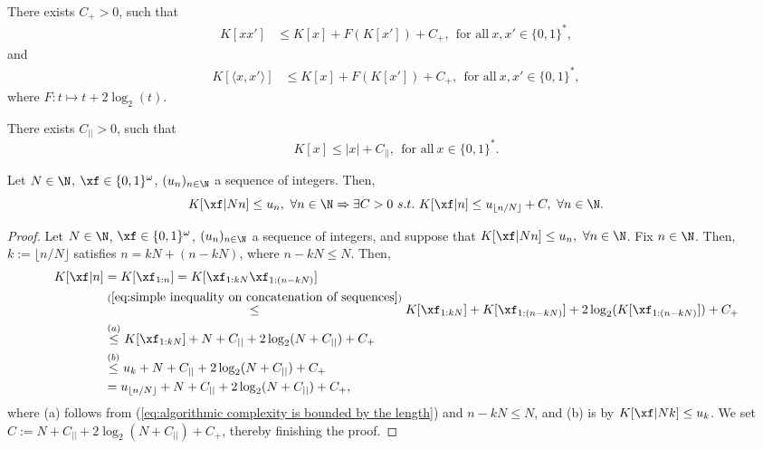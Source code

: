\begin{lemma}
	\cite[Example 2.1.5]{li2008introduction} There exists $C_+>0$, such that
	\begin{align}\label{eq:simple inequality on concatenation of sequences}
		K[ x x'] &\leq K[x] + F(K[x']) + C_+, \ \ \text{for all} \ x,x' \in \{0,1\}^\ast,
	\end{align}
	and
	\begin{align}\label{eq:simple inequality on pairing of sequences}
		K[ \langle x, x'\rangle] &\leq K[x] + F(K[x']) + C_+, \ \ \text{for all} \ x,x' \in \{0,1\}^\ast,
	\end{align}
	where $F:t\mapsto t + 2\log_2(t)$.
\end{lemma}
\begin{lemma}\cite[Theorem 2.1.2]{li2008introduction} There exists $C_{||} > 0$, such that 
	\begin{equation}\label{eq:algorithmic complexity is bounded by the length}
		K[x] \leq |x| + C_{||}, \ \ \text{for all} \ x \in \{0,1\}^\ast.
	\end{equation}
\end{lemma}
\begin{lemma}
	Let $N \in \N$, $\xf \in \{0,1\}^\omega$, $(u_n)_{n \in \N}$ a sequence of integers. Then, 
	\begin{equation}
		K[\xf|N n] \leq u_n, \ \forall n \in \N \Rightarrow \exists C > 0 \ s.t. \ K[\xf|n] \leq u_{\lfloor n/N \rfloor } + C, \ \forall n \in \N.
	\end{equation}
\end{lemma}
\begin{proof}
	Let $N \in \N$, $\xf \in \{0,1\}^\omega$, $(u_n)_{n \in \N}$ a sequence of integers, and suppose that $K[\xf|N n] \leq u_n, \ \forall n \in \N$. Fix $n \in \N$. Then, $k := \lfloor n/N \rfloor$ satisfies $n = kN + (n - kN)$, where $n - kN \leq N$. Then,
	\begin{align}
		K[\xf|n] &= K[\xf_{1: n}] = K[\xf_{1: kN}  \xf_{1: (n- kN)}] \\
		&\overset{(\ref{eq:simple inequality on concatenation of sequences})}{\leq} K[\xf_{1: kN}] + K[\xf_{1: (n- kN)}] + 2 \log_2 (K[\xf_{1: (n- kN)}]) + C_+\\
		&\overset{(a)}{\leq} K[\xf_{1: kN}] + N + C_{||} + 2 \log_2 (N + C_{||}) + C_{+}\\
		&\overset{(b)}{\leq} u_k + N + C_{||} + 2 \log_2 (N + C_{||}) + C_{+}\\
		&= u_{\lfloor n/N \rfloor} + N + C_{||} + 2 \log_2 (N + C_{||}) + C_{+},
	\end{align}
	where (a) follows from (\ref{eq:algorithmic complexity is bounded by the length}) and $n - kN \leq N$, and (b) is by $K[\xf|N k] \leq u_k$. We set $C:= N + C_{||} + 2 \log_2 (N + C_{||}) + C_{+}$, thereby finishing the proof.
\end{proof}
